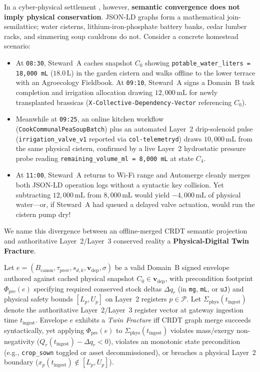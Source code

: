 In a cyber-physical settlement \parencite{grieves2014digital,kleppmann2017designing}, however, \textbf{semantic convergence does not imply physical conservation}. JSON-LD graphs form a mathematical join-semilattice; water cisterns, lithium-iron-phosphate battery banks, cedar lumber racks, and simmering soup cauldrons do not. Consider a concrete homestead scenario:
\begin{itemize}
  \item At \texttt{08:30}, Steward~A caches snapshot $C_0$ showing \texttt{potable\_water\_liters = 18,000 mL} ($18.0\,\mathrm{L}$) in the garden cistern and walks offline to the lower terrace with an Agroecology Fieldbook. At \texttt{09:10}, Steward~A signs a Domain~B task completion and irrigation allocation drawing $12{,}000\,\mathrm{mL}$ for newly transplanted brassicas (\texttt{X-Collective-Dependency-Vector} referencing $C_0$).
  \item Meanwhile at \texttt{09:25}, an online kitchen workflow (\texttt{CookCommunalPeaSoupBatch}) plus an automated Layer~2 drip-solenoid pulse (\texttt{irrigation\_valve\_v1} reported via \texttt{col-telemetryd}) draws $10{,}000\,\mathrm{mL}$ from the same physical cistern, confirmed by a live Layer~2 hydrostatic pressure probe reading \texttt{remaining\_volume\_ml = 8,000 mL} at state $C_4$.
  \item At \texttt{11:00}, Steward~A returns to Wi-Fi range and Automerge cleanly merges both JSON-LD operation logs without a syntactic key collision. Yet subtracting $12{,}000\,\mathrm{mL}$ from $8{,}000\,\mathrm{mL}$ would yield $-4{,}000\,\mathrm{mL}$ of physical water---or, if Steward~A had queued a delayed valve actuation, would run the cistern pump dry!
\end{itemize}

We name this divergence between an offline-merged CRDT semantic projection and authoritative Layer~2/Layer~3 conserved reality a \textbf{Physical-Digital Twin Fracture}.

\begin{definition}
\label{def:twin-fracture}
Let $e = (B_{\mathrm{canon}}, \tau_{\mathrm{prov}}, s_{d,k}, \mathbf{v}_{\mathrm{dep}}, \sigma)$ be a valid Domain~B signed envelope authored against cached physical snapshot $C_0 \in \mathbf{v}_{\mathrm{dep}}$, with precondition footprint $\Phi_{\mathrm{pre}}(e)$ specifying required conserved stock deltas $\Delta q_r$ (in \texttt{mg}, \texttt{mL}, or \texttt{uJ}) and physical safety bounds $[L_p, U_p]$ on Layer~2 registers $p \in \mathcal{P}$. Let $\Sigma_{\mathrm{phys}}(t_{\mathrm{ingest}})$ denote the authoritative Layer~2/Layer~3 register vector at gateway ingestion time $t_{\mathrm{ingest}}$. Envelope $e$ exhibits a \emph{Twin Fracture} iff CRDT graph merge succeeds syntactically, yet applying $\Phi_{\mathrm{pre}}(e)$ to $\Sigma_{\mathrm{phys}}(t_{\mathrm{ingest}})$ violates mass/exergy non-negativity ($Q_r(t_{\mathrm{ingest}}) - \Delta q_r < 0$), violates an monotonic state precondition (e.g., \texttt{crop\_sown} toggled or asset decommissioned), or breaches a physical Layer~2 boundary ($x_p(t_{\mathrm{ingest}}) \notin [L_p, U_p]$).
\end{definition}


